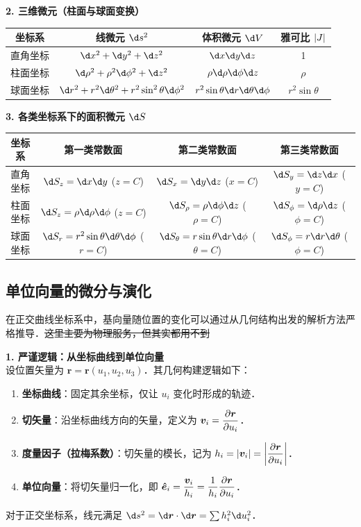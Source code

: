 \documentclass[12pt, a4paper, oneside, UTF8]{ctexbook}
\begin{document}
\noindent \textbf{2. 三维微元（柱面与球面变换）}
\begin{center}
\renewcommand{\arraystretch}{1.6}
\begin{tabular}{|c|c|c|c|}
\hline
\textbf{坐标系} & \textbf{线微元 $\d s^2$} & \textbf{体积微元 $\d V$} & \textbf{雅可比 $\abs{J}$} \\ \hline
直角坐标 & $\d x^2 + \d y^2 + \d z^2$ & $\d x \d y \d z$ & 1 \\ \hline
柱面坐标 & $\d \rho^2 + \rho^2 \d \phi^2 + \d z^2$ & $\rho \d \rho \d \phi \d z$ & $\rho$ \\ \hline
球面坐标 & $\d r^2 + r^2 \d \theta^2 + r^2 \sin^2 \theta \d \phi^2$ & $r^2 \sin \theta \d r \d \theta \d \phi$ & $r^2 \sin \theta$ \\ \hline
\end{tabular}
\end{center}

\noindent \textbf{3. 各类坐标系下的面积微元 $\d S$}
\begin{center}
\renewcommand{\arraystretch}{1.8}
\setlength{\tabcolsep}{8pt}
\begin{tabular}{|c|c|c|c|}
\hline
\textbf{坐标系} & \textbf{第一类常数面} & \textbf{第二类常数面} & \textbf{第三类常数面} \\ \hline
直角坐标 & $\d S_z = \d x \d y$ ($z=C$) & $\d S_x = \d y \d z$ ($x=C$) & $\d S_y = \d z \d x$ ($y=C$) \\ \hline
柱面坐标 & $\d S_z = \rho \d \rho \d \phi$ ($z=C$) & $\d S_\rho = \rho \d \phi \d z$ ($\rho=C$) & $\d S_\phi = \d \rho \d z$ ($\phi=C$) \\ \hline
球面坐标 & $\d S_r = r^2 \sin\theta \d \theta \d \phi$ ($r=C$) & $\d S_\theta = r \sin\theta \d r \d \phi$ ($\theta=C$) & $\d S_\phi = r \d r \d \theta$ ($\phi=C$) \\ \hline
\end{tabular}
\end{center}

\subsection{单位向量的微分与演化}
在正交曲线坐标系中，基向量随位置的变化可以通过从几何结构出发的解析方法严格推导．\sout{这里主要为物理服务，但其实都用不到}

\noindent \textbf{1. 严谨逻辑：从坐标曲线到单位向量} \\
设位置矢量为 $\bm{r} = \bm{r}(u_1, u_2, u_3)$．其几何构建逻辑如下：
\begin{enumerate}
    \item \textbf{坐标曲线}：固定其余坐标，仅让 $u_i$ 变化时形成的轨迹．
    \item \textbf{切矢量}：沿坐标曲线方向的矢量，定义为 $\bm{v}_i = \displaystyle\pdv{\bm{r}}{u_i}$．
    \item \textbf{度量因子（拉梅系数）}：切矢量的模长，记为 $h_i = \abs{\bm{v}_i} = \abs{\displaystyle\pdv{\bm{r}}{u_i}}$．
    \item \textbf{单位向量}：将切矢量归一化，即 $\bm{\hat{e}}_i = \displaystyle\frac{\bm{v}_i}{h_i} = \frac{1}{h_i} \pdv{\bm{r}}{u_i}$．
\end{enumerate}
对于正交坐标系，线元满足 $\d s^2 = \d \bm{r} \cdot \d \bm{r} = \sum h_i^2 \d u_i^2$．
\end{document}
